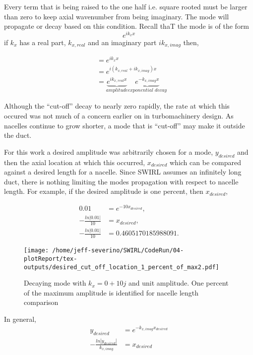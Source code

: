 \begin{frame}
    
Every term that is being raised to the one half i.e. square rooted must 
be larger than zero to keep axial wavenumber from being imaginary. The mode 
will propagate or decay based on this condition. Recall thaT the mode is of the 
form 
\begin{equation}
    e^{i k_x x}
    \label{eqn:fluctuationexample}
\end{equation}
if $k_x$ has a real part, $k_{x,real}$ and an imaginary part $i k_{x,imag}$ 
then,

\begin{align}
    &= e^{i k_x x} \\
    &= e^{i (k_{x,real}+ i k_{x,imag}) x} \\
    &= \underbrace{e^{i k_{x,real}x}}_{\textit{amplitude}} \underbrace{e^{- k_{x,imag} x}}_{\textit{exponential decay}} 
\end{align}


\end{frame}
\begin{frame}
    

Although the ``cut-off'' decay to nearly zero rapidly, the rate at which this occured
was not much of a concern earlier on in turbomachinery design. As nacelles 
continue to grow shorter, a mode that is ``cut-off'' may make it outside the duct.

For this work a desired amplitude was arbitrarily chosen for a mode, $y_{desired}$
and then the axial location at which this occurred, $x_{desired}$ which 
can be compared against a desired length for a nacelle.  
Since SWIRL assumes an infinitely long duct, there is nothing limiting the 
modes propagation with respect to nacelle length. For example, if the 
desired amplitude is one percent, then $x_{desired}$,

\begin{align*}
    0.01 &=  e^{-10 x_{desired}},\\
    -\frac{ln|0.01|}{10} &=  x_{desired},\\
    -\frac{ln|0.01|}{10} &= 0.4605170185988091 .
\end{align*}

\end{frame}
\begin{frame}
    


 \begin{figure}
     \centering
     \texttt{[image: /home/jeff-severino/SWIRL/CodeRun/04-plotReport/tex-outputs/desired\_cut\_off\_location\_1\_percent\_of\_max2.pdf]}
     \caption{Decaying mode with $k_x = 0 + 10j$ and unit amplitude. One percent
     of the maximum amplitude is identified for nacelle length comparison}
     \label{fig:decaying_mode_with_1_percent_amp}
 \end{figure}
 
 
In general,
\begin{align*}
    y_{desired} &=  e^{-k_{x,imag} x_{desired} }\\
    -\frac{ln|y_{desired}|}{k_{x,imag}} &=  x_{desired}
\end{align*}
\end{frame}
